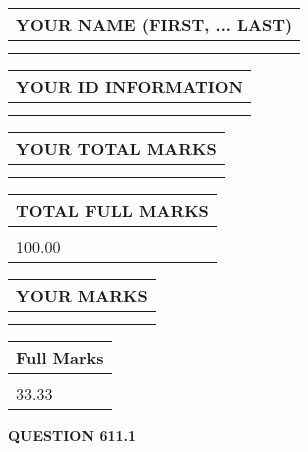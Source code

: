 \documentclass{ctexart}
\begin{document}
   
   
   
\newpage 
\setcounter{page}{ 
   611001 } 
   
   
   
   
\noindent\begin{tabular}{|l|}
\hline
YOUR NAME (FIRST, ... LAST)  \\
\hline
 \\ 
 \\ 
\hline
\end{tabular}
\hspace{0.05in} \begin{tabular}{|l|}
\hline
 YOUR   ID   INFORMATION  \\
\hline
 \\ 
 \\ 
\hline
\end{tabular}
   
   
\vspace{0.2in}\noindent\begin{tabular}{|l|}
\hline
YOUR TOTAL MARKS  \\
\hline
 \\ 
 \\ 
\hline
\end{tabular}
\hspace{0.05in} \begin{tabular}{|l|}
\hline
TOTAL FULL MARKS  \\
\hline
 \\ 
100.00 \\
\hline
\end{tabular}
   
   
 \vspace{0.2in}
 
 
 
 
   
   
  
\vspace{0.2in}
  
\noindent\begin{tabular}{|l|}
\hline
 YOUR MARKS  \\
\hline
 \\ 
 \\ 
\hline
\end{tabular}
\hspace{0.05in} \begin{tabular}{|l|}
\hline
 Full Marks  \\
\hline
 \\ 
33.33 \\
\hline
\end{tabular}
{\textbf{\Large{QUESTION
611.1 
}}}
  
\end{document}
